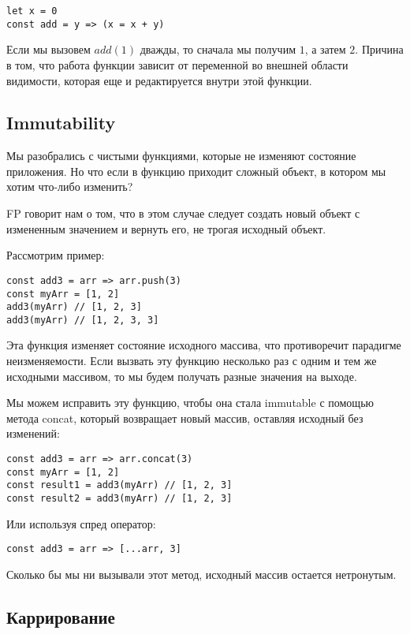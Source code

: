 \begin{lstlisting}
let x = 0
const add = y => (x = x + y)
\end{lstlisting}

Если мы вызовем $add(1)$ дважды, то сначала мы получим $1$, а затем $2$. Причина в том, что работа функции зависит от переменной во внешней области видимости, которая еще и редактируется внутри этой функции.

\subsection{Immutability}

Мы разобрались с чистыми функциями, которые не изменяют состояние приложения. Но что если в функцию приходит сложный объект, в котором мы хотим что-либо изменить? 

FP говорит нам о том, что в этом случае следует создать новый объект с измененным значением и вернуть его, не трогая исходный объект.

Рассмотрим пример:

\begin{lstlisting}
const add3 = arr => arr.push(3)
const myArr = [1, 2]
add3(myArr) // [1, 2, 3]
add3(myArr) // [1, 2, 3, 3]
\end{lstlisting}

Эта функция изменяет состояние исходного массива, что противоречит парадигме неизменяемости. Если вызвать эту функцию несколько раз с одним и тем же исходными массивом, то мы будем получать разные значения на выходе.

Мы можем исправить эту функцию, чтобы она стала immutable с помощью метода concat, который возвращает новый массив, оставляя исходный без изменений:

\begin{lstlisting}
const add3 = arr => arr.concat(3)
const myArr = [1, 2]
const result1 = add3(myArr) // [1, 2, 3]
const result2 = add3(myArr) // [1, 2, 3]
\end{lstlisting}

Или используя спред оператор:

\begin{lstlisting}
const add3 = arr => [...arr, 3]
\end{lstlisting}

Сколько бы мы ни вызывали этот метод, исходный массив остается нетронутым. 

\subsection{Каррирование}

